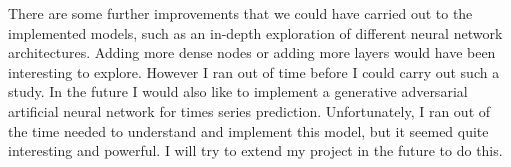 \documentclass[10pt,a4paper]{article}
\begin{document}
There are some further improvements that we could have carried out to the implemented models, such as an in-depth exploration of different neural network architectures. Adding more dense nodes or adding more layers would have been interesting to explore. However I ran out of time before I could carry out such a study. In the future I would also like to implement a generative adversarial artificial neural network for times series prediction. Unfortunately, I ran out of the time needed to understand and implement this model, but it seemed quite interesting and powerful. I will try to extend my project in the future to do this.


%
\end{document}
